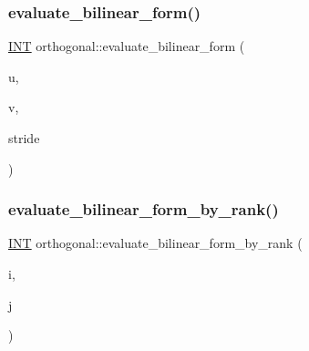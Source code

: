 \mbox{\label{classorthogonal_a1cb22ce04ab60e22852f610ec3fe5c98}} 
\subsubsection{\texorpdfstring{evaluate\+\_\+bilinear\+\_\+form()}{evaluate\_bilinear\_form()}}
{\footnotesize\ttfamily \mbox{\hyperlink{galois_8h_a09fddde158a3a20bd2dcadb609de11dc}{I\+NT}} orthogonal\+::evaluate\+\_\+bilinear\+\_\+form (\begin{DoxyParamCaption}\item[{\mbox{\hyperlink{galois_8h_a09fddde158a3a20bd2dcadb609de11dc}{I\+NT}} $\ast$}]{u,  }\item[{\mbox{\hyperlink{galois_8h_a09fddde158a3a20bd2dcadb609de11dc}{I\+NT}} $\ast$}]{v,  }\item[{\mbox{\hyperlink{galois_8h_a09fddde158a3a20bd2dcadb609de11dc}{I\+NT}}}]{stride }\end{DoxyParamCaption})}

\mbox{\label{classorthogonal_ab4f6117f55f6fbd0fb2bd8b4c8d981bf}} 
\subsubsection{\texorpdfstring{evaluate\+\_\+bilinear\+\_\+form\+\_\+by\+\_\+rank()}{evaluate\_bilinear\_form\_by\_rank()}}
{\footnotesize\ttfamily \mbox{\hyperlink{galois_8h_a09fddde158a3a20bd2dcadb609de11dc}{I\+NT}} orthogonal\+::evaluate\+\_\+bilinear\+\_\+form\+\_\+by\+\_\+rank (\begin{DoxyParamCaption}\item[{\mbox{\hyperlink{galois_8h_a09fddde158a3a20bd2dcadb609de11dc}{I\+NT}}}]{i,  }\item[{\mbox{\hyperlink{galois_8h_a09fddde158a3a20bd2dcadb609de11dc}{I\+NT}}}]{j }\end{DoxyParamCaption})}

\mbox{\label{classorthogonal_a839dc01b1c59a23b054ccf70c00cc9c9}} 
